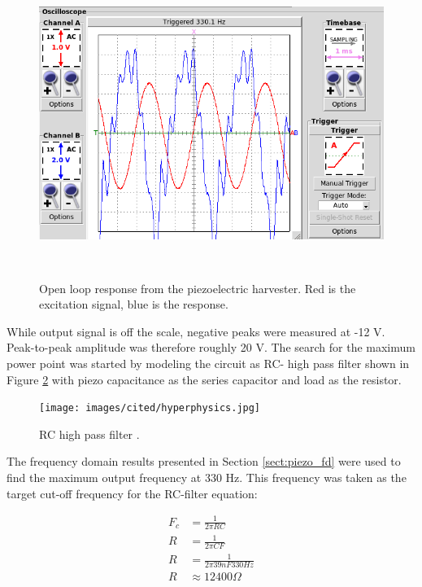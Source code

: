 \begin{figure}[htb]
\begin{center}
\includegraphics[height=10cm]{images/own_measurement/generator_shaker/piezo_td_open_330hz_2_2.png}
\end{center}
\caption{\label{fig:piezo_td_open} Open loop response from the piezoelectric harvester. Red is the excitation signal, blue is the response.}
\end{figure}

While output signal is off the scale, negative peaks were measured at -12 V. Peak-to-peak amplitude was therefore roughly 20 V. The search for the maximum power point was started by modeling the circuit as RC- high pass filter shown in Figure \ref{fig:rc_highpass} with piezo capacitance as the series capacitor and load as the resistor. 

\begin{figure}[htb]
\begin{center}
\texttt{[image: images/cited/hyperphysics.jpg]}
\end{center}
\caption{\label{fig:rc_highpass} RC high pass filter \cite{hyperphysics}.}
\end{figure}

The frequency domain results presented in Section \ref{sect:piezo_fd} were used to find the maximum output frequency at 330 Hz. This frequency was taken as the target cut-off frequency for the RC-filter equation:

\begin{equation}
\begin{split}
  F_c &= \frac{1}{2 \pi R C} \\
  R   &= \frac{1}{2 \pi C F} \\
  R   &= \frac{1}{2 \pi 39 nF 330 Hz} \\
  R   &\approx 12 400 \Omega 
\end{split}
\end{equation}

